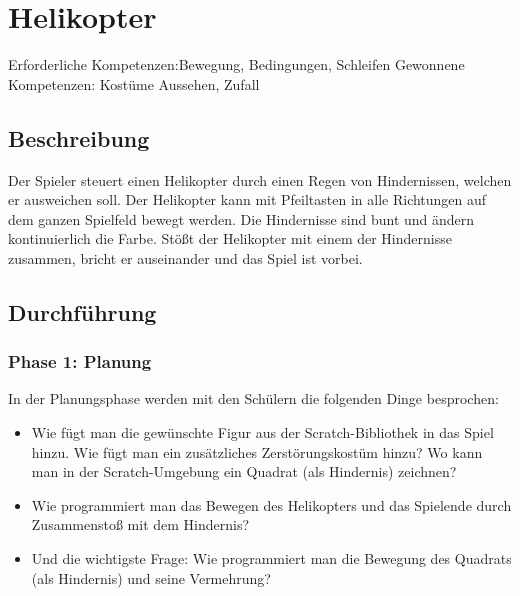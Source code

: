 \section{Helikopter}\label{helikopter}

Erforderliche Kompetenzen:Bewegung, Bedingungen, Schleifen Gewonnene
Kompetenzen: Kostüme Aussehen, Zufall

\begin{figure}[ht]
    \centering 
    \caption[\Sectionname]{\Sectionname}
\end{figure}

\subsection{Beschreibung}\label{beschreibung}

Der Spieler steuert einen Helikopter durch einen Regen von Hindernissen,
welchen er ausweichen soll. Der Helikopter kann mit Pfeiltasten in alle
Richtungen auf dem ganzen Spielfeld bewegt werden. Die Hindernisse sind
bunt und ändern kontinuierlich die Farbe. Stößt der Helikopter mit einem
der Hindernisse zusammen, bricht er auseinander und das Spiel ist
vorbei.

\subsection{Durchführung}\label{durchfuxfchrung}

\subsubsection{Phase 1: Planung}\label{phase-1-planung}

In der Planungsphase werden mit den Schülern die folgenden Dinge
besprochen:

\begin{itemize}
\item
  Wie fügt man die gewünschte Figur aus der Scratch-Bibliothek in das
  Spiel hinzu. Wie fügt man ein zusätzliches Zerstörungskostüm hinzu? Wo
  kann man in der Scratch-Umgebung ein Quadrat (als Hindernis) zeichnen?
\item
  Wie programmiert man das Bewegen des Helikopters und das Spielende
  durch Zusammenstoß mit dem Hindernis?
\item
  Und die wichtigste Frage: Wie programmiert man die Bewegung des
  Quadrats (als Hindernis) und seine Vermehrung?
\end{itemize}

